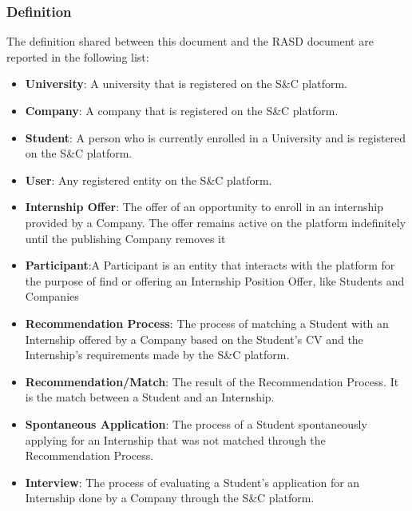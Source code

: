 \subsubsection{Definition}
The definition shared between this document and the RASD document are reported in the following list:
\begin{itemize}
    \item \textcolor{titleColor}{\textbf{University}\label{def:university}}: A university that is registered on the S\&C platform.
    \item \textcolor{titleColor}{\textbf{Company}\label{def:company}}: A company that is registered on the S\&C platform.
    \item \textcolor{titleColor}{\textbf{Student}\label{def:student}}: A person who is currently enrolled in a University and is registered on the S\&C platform.
    \item \textcolor{titleColor}{\textbf{User}\label{def:user}}: Any registered entity on the S\&C platform.
    \item \textcolor{titleColor}{\textbf{Internship Offer}\label{def:internshipOffer}}: The offer of an opportunity to enroll in an internship provided by a Company. The offer remains active on the platform indefinitely until the publishing Company removes it
    \item \textcolor{titleColor}{\textbf{Participant}}\label{def:participant}:{A Participant is an entity that interacts with the platform for the purpose of find or offering an Internship Position Offer, like Students and Companies
    }
    \item \textcolor{titleColor}{\textbf{Recommendation Process}}\label{def:recommendationProcess}: The process of matching a Student with an Internship offered by a Company based on the Student's CV and the Internship's requirements made by the S\&C platform.
    \item \textcolor{titleColor}{\textbf{Recommendation/Match}\label{def:match}}: The result of the Recommendation Process. It is the match between a Student and an Internship.
    \item \textcolor{titleColor}{\textbf{Spontaneous Application}\label{def:spontaneousApplication}}: The process of a Student spontaneously applying for an Internship that was not matched through the Recommendation Process.
    \item \textcolor{titleColor}{\textbf{Interview}\label{def:Interview}}: The process of evaluating a Student's application for an Internship done by a Company through the S\&C platform. 

\end{itemize}
